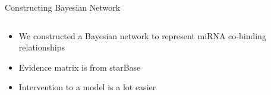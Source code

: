 \documentclass{beamer}
\begin{document}
\begin{frame}{Constructing Bayesian Network}
\begin{columns}
		\begin{column}[t]{.48\textwidth}
			\begin{itemize}
				\item We constructed a Bayesian network to represent miRNA co-binding relationships
				\item Evidence matrix is from starBase
				      \begin{table}[]
				      \end{table}
				\item Intervention to a model is a lot easier
			\end{itemize}
		\end{column}
	\end{columns}
\end{frame}
\end{document}
